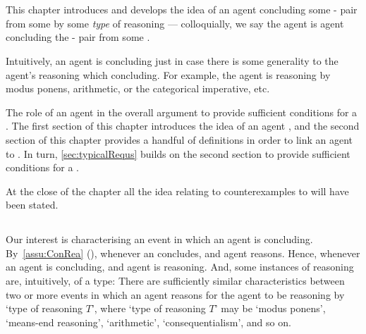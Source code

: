 \chapter{}
\label{cha:typical}

\nocite{Wilson:1994aa}
\nocite{Goodman:1983aa}

\begin{note}
  This chapter introduces and develops the idea of an agent concluding some - pair from some \pool{} by some \emph{type} of reasoning --- colloquially, we say the agent is agent \emph{\typeAdj{}} concluding the - pair from some \pool{}.

  Intuitively, an agent is \typeAdj{} concluding just in case there is some generality to the agent's reasoning which concluding.
  For example, the agent is reasoning by modus ponens, arithmetic, or the categorical imperative, etc.
\end{note}


\begin{note}
  The role of an agent \tCV{} in the overall argument to provide sufficient conditions for a \requ{}.
  The first section of this chapter introduces the idea of an agent \tCV{}, and the second section of this chapter provides a handful of definitions in order to link an agent \tCN{} to .
  In turn, \autoref{sec:typicalRequs} builds on the second section to provide sufficient conditions for a \requ{}.
\end{note}


\begin{note}
  At the close of the chapter all the idea relating to counterexamples to \issueConstraint{} will have been stated.
\end{note}


\section{}
\label{cha:typical:int}

\begin{note}
  Our interest is characterising an event in which an agent is concluding.
  By~\autoref{assu:ConRea} (), whenever an concludes, and agent reasons.
  Hence, whenever an agent is concluding, and agent is reasoning.
  And, some instances of reasoning are, intuitively, of a type:
  There are sufficiently similar characteristics between two or more events in which an agent reasons for the agent to be reasoning by `type of reasoning \(T\)', where `type of reasoning \(T\)' may be `modus ponens', `means-end reasoning', `arithmetic', `consequentialism', and so on.
\end{note}


